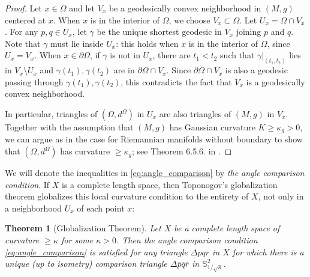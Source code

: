 \documentclass[12pt]{amsart}
\numberwithin{equation}{section}
\newtheorem{thm}{Theorem}[section]
\theoremstyle{remark}
\begin{document}
	\begin{proof}
		Let $x\in \Omega$ and let $V_x$ be a geodesically convex neighborhood in $(M, g)$ centered at $x$. When $x$ is in the interior of $\Omega$, we choose $V_x\subset \Omega$. Let $U_x = \Omega \cap V_x$. For any $p, q\in U_x$, let $\gamma$ be the unique shortest geodesic in $V_x$ joining $p$ and $q$. Note that $\gamma$ must lie inside $U_x$: this holds when $x$ is in the interior of $\Omega$, since $U_x = V_x$. When $x\in \partial \Omega$, if $\gamma$ is not in $U_x$, there are $t_1<t_2$ such that $\gamma |_{(t_1, t_2)}$ lies in $V_x \setminus U_x$ and $\gamma(t_1), \gamma(t_2)$ are in $\partial \Omega \cap V_x$. Since $\partial \Omega \cap V_x$ is also a geodesic passing through $\gamma(t_1), \gamma(t_2)$, this contradicts the fact that $V_x$ is a geodesically convex neighborhood. 
		
		In particular, triangles of $(\Omega, d^\Omega)$ in  $U_x$ are also triangles of $(M, g) $ in $V_x$. Together with the assumption that $(M, g)$ has Gaussian curvature $K\ge \kappa _g >0$, we can argue as in the case for Riemannian manifolds without boundary to show that $(\Omega, d^\Omega)$ has curvature $\geq \kappa_g$; see Theorem 6.5.6. in \cite{BBI}.
	\end{proof}
	
	We will denote the inequalities in \eqref{eq:angle_comparison} by \textit{the angle comparison condition}. If $X$ is a complete length space, then Toponogov's globalization theorem \cite[Theorem 10.3.1]{BBI} globalizes this local curvature condition to the entirety of $X$, not only in a neighborhood $U_x$ of each point $x$: 
	\begin{thm}[Globalization Theorem]\label{thm:globalization}
		Let $X$ be a complete length space of curvature $\geq \kappa$ for some $\kappa>0$. Then the angle comparison condition \eqref{eq:angle_comparison} is satisfied for any triangle $\Delta pqr$ in $X$ for which there is a unique (up to isometry) comparison triangle $\Delta \bar{p}\bar{q}\bar{r}$ in $\mathbb S^2_{1/\sqrt\kappa}$.
		
	\end{thm}
	
\end{document}
